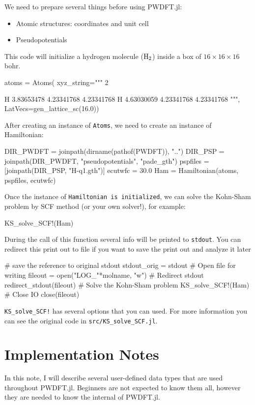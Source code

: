 \documentclass[a4paper,12pt]{article}
\newcommand{\jlcode}[1]{\texttt{#1}}
\newcommand{\myverbcode}[1]{\texttt{#1}}
\begin{document}
We need to prepare several things before using \textsf{PWDFT.jl}:
\begin{itemize}
\item Atomic structures: coordinates and unit cell
\item Pseudopotentials
\end{itemize}

This code will initialize a hydrogen molecule ($\ce{H2}$) inside a box of
$16\times16\times16$ bohr.
\begin{juliacode}
atoms = Atoms(
  xyz_string="""
  2
    
  H      3.83653478       4.23341768       4.23341768
  H      4.63030059       4.23341768       4.23341768
  """,
  LatVecs=gen_lattice_sc(16.0))
\end{juliacode}


After creating an instance of \jlcode{Atoms}, we need to create
an instance of Hamiltonian:
\begin{juliacode}
DIR_PWDFT = joinpath(dirname(pathof(PWDFT)), "..")
DIR_PSP = joinpath(DIR_PWDFT, "pseudopotentials", "pade_gth")
pspfiles = [joinpath(DIR_PSP, "H-q1.gth")]
ecutwfc = 30.0 
Ham = Hamiltonian(atoms, pspfiles, ecutwfc)
\end{juliacode}

Once the instance of \jlcode{Hamiltonian is initialized}, we can solve
the Kohn-Sham problem by SCF method (or your own solver!),
for example:
\begin{juliacode}
KS_solve_SCF!(Ham)
\end{juliacode}
During the call of this function several info will be printed to
\jlcode{stdout}. You can redirect this print out to file if you
want to save the print out and analyze it later
\begin{juliacode}
# save the reference to original stdout
stdout_orig = stdout
# Open file for writing
fileout = open("LOG_"*molname, "w")
# Redirect stdout
redirect_stdout(fileout)
# Solve the Kohn-Sham problem
KS_solve_SCF!(Ham)
# Close IO
close(fileout)
\end{juliacode}

\jlcode{KS_solve_SCF!} has several options that you can used.
For more information you can see the original code in
\myverbcode{src/KS_solve_SCF.jl}.


\part{Implementation Notes}

In this note, I will describe several user-defined data types that are
used throughout \textsf{PWDFT.jl}. Beginners are not expected to know them
all, however they are needed to know the internal of \textsf{PWDFT.jl}.
\end{document}
